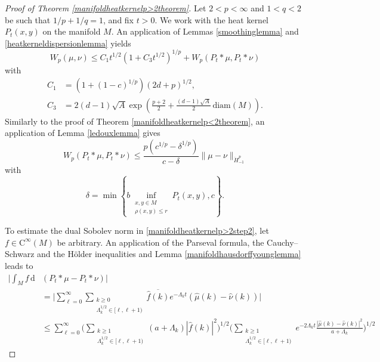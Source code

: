 \documentclass[11pt,a4paper]{article}
\theoremstyle{definition}
\begin{document}
\begin{proof}[Proof of Theorem \ref{manifoldheatkernelp>2theorem}] Let $2<p<\infty$ and $1<q<2$ be such that $1/p+1/q=1$, and fix $t>0$. We work with the heat kernel $P_t (x,y)$ on the manifold $M$. An application of Lemmas \ref{smoothinglemma} and \ref{heatkerneldispersionlemma} yields
\begin{equation}\label{manifoldheatkernelp>2step1}
W_p (\mu, \nu) \le C_1 t^{1/2} \left(1+C_3 t^{1/2} \right)^{1/p} + W_p(P_t * \mu, P_t * \nu)
\end{equation}
with
\[ \begin{split} C_1 &= (1+(1-c)^{1/p}) (2d+p)^{1/2}, \\ C_3 &= 2 (d-1) \sqrt{A} \exp \left( \frac{p+2}{2} + \frac{(d-1) \sqrt{A}}{2} \, \mathrm{diam}(M) \right) . \end{split} \]
Similarly to the proof of Theorem \ref{manifoldheatkernelp<2theorem}, an application of Lemma \ref{ledouxlemma} gives
\begin{equation}\label{manifoldheatkernelp>2step2}
W_p (P_t * \mu, P_t * \nu) \le \frac{p(c^{1/p} - \delta^{1/p})}{c-\delta} \| \mu - \nu \|_{\dot{H}_{-1}^p}
\end{equation}
with
\[ \delta = \min \left\{ b \inf_{\substack{x,y \in M \\ \rho (x,y) \le r}} P_t (x,y), c \right\} . \]

To estimate the dual Sobolev norm in \eqref{manifoldheatkernelp>2step2}, let $f \in \mathrm{C}^{\infty}(M)$ be arbitrary. An application of the Parseval formula, the Cauchy--Schwarz and the H\"older inequalities and Lemma \ref{manifoldhausdorffyounglemma} leads to
\[ \begin{split} \Bigg| \int_M f \, \mathrm{d}&(P_t * \mu - P_t*\nu) \Bigg| \\ &= \Bigg| \sum_{\ell=0}^{\infty} \sum_{\substack{k \ge 0 \\ \Lambda_k^{1/2} \in [\ell, \ell+1)}} \overline{\widehat{f}(k)} e^{-\Lambda_k t} (\widehat{\mu}(k) - \widehat{\nu}(k)) \Bigg| \\ &\le \sum_{\ell=0}^{\infty} \Bigg( \sum_{\substack{k \ge 1 \\ \Lambda_k^{1/2} \in [\ell, \ell+1)}} (a+\Lambda_k) |\widehat{f}(k)|^2 \Bigg)^{1/2} \Bigg( \sum_{\substack{k \ge 1 \\ \Lambda_k^{1/2} \in [\ell, \ell+1)}} e^{-2 \Lambda_k t} \frac{|\widehat{\mu}(k) - \widehat{\nu}(k)|^2}{a+\Lambda_k} \Bigg)^{1/2} \end{split} \]


\end{proof}
\end{document}
